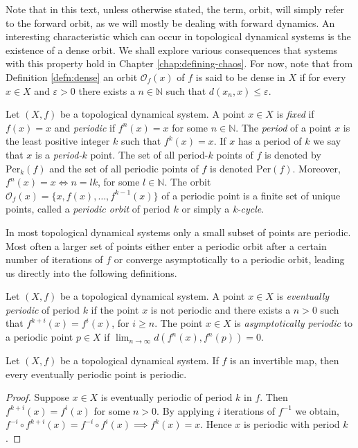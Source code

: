 Note that in this text, unless otherwise stated, the term, orbit, will simply refer to the forward orbit, as we will mostly be dealing with forward dynamics. An interesting characteristic which can occur in topological dynamical systems is the existence of a dense orbit. We shall explore various consequences that systems with this property hold in Chapter \ref{chap:defining-chaos}. For now, note that from Definition \ref{defn:dense} an orbit $\mathcal{O}_f(x)$ of $f$ is said to be dense in $X$ if for every $x \in X$ and $\varepsilon > 0$ there exists a $n \in \mathbb{N}$ such that $d(x_n, x) \leq \varepsilon$.

\begin{defn} \label{defn:periodic-point}
    Let $(X, f)$ be a topological dynamical system. A point $x \in X$ is \emph{fixed} if $f(x) = x$ and \emph{periodic} if $f^n(x) = x$ for some $n \in \mathbb{N}$. The \emph{period} of a point $x$ is the least positive integer $k$ such that $f^k(x) = x$. If $x$ has a period of $k$ we say that $x$ is a \emph{period-$k$} point. The set of all period-$k$ points of $f$ is denoted by $\text{Per}_k(f)$ and the set of all periodic points of $f$ is denoted $\text{Per}(f)$. Moreover, $f^n(x) = x \iff n = lk$, for some $l \in \mathbb{N}$. The orbit $\mathcal{O}_f(x) = \lbrace x, f(x), \dots, f^{k-1}(x) \rbrace$ of a periodic point is a finite set of unique points, called a \emph{periodic orbit} of period $k$ or simply a \emph{k-cycle}.
\end{defn}

In most topological dynamical systems only a small subset of points are periodic. Most often a larger set of points either enter a periodic orbit after a certain number of iterations of $f$ or converge asymptotically to a periodic orbit, leading us directly into the following definitions.

\begin{defn} \label{defn:eventually-asymptotically-periodic}
    Let $(X, f)$ be a topological dynamical system. A point $x \in X$ is \emph{eventually periodic} of period $k$ if the point $x$ is not periodic and there exists a $n > 0$ such that $f^{k+i}(x) = f^i(x)$, for $i \geq n$. The point $x \in X$ is \emph{asymptotically periodic} to a periodic point $p \in X$ if $\lim_{n \to \infty} d(f^n(x), f^n(p)) = 0$.
\end{defn}

\begin{prop} \label{prop:eventually-periodic-implies-periodic}
    Let $(X, f)$ be a topological dynamical system. If $f$ is an invertible map, then every eventually periodic point is periodic.
    \begin{proof}
        Suppose $x \in X$ is eventually periodic of period $k$ in $f$. Then $f^{k + i}(x) = f^i(x)$ for some $n > 0$. By applying $i$ iterations of $f^{-1}$ we obtain, $f^{-i} \circ f^{k + i}(x) = f^{-i} \circ f^{i}(x) \implies f^k(x) = x$. Hence $x$ is periodic with period $k$.
    \end{proof}
\end{prop}

